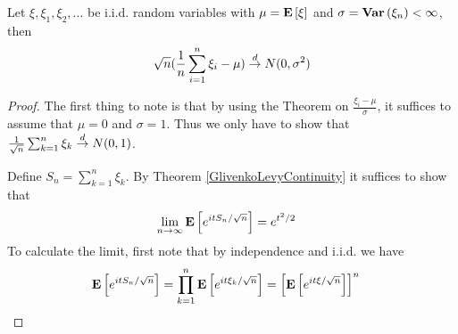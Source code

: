 \begin{thm}\label{CentralLimitTheorem}Let
  $\xi, \xi_1, \xi_2, \dots$ be i.i.d. random variables with $\mu =
  \textbf{E}\left[\xi\right]$ and 
  $\sigma = \textbf{Var} \left (\xi_n \right ) < \infty$, then 
\begin{align*}
\sqrt{n} (\frac{1}{n}\sum_{i=1}^n \xi_i -  \mu) \overset{d}\to N(0,\sigma^2)
\end{align*}
\end{thm}
\begin{proof}
The first thing to note is that by using the Theorem on $\frac{\xi_i -
  \mu}{\sigma}$, it suffices to assume that $\mu = 0$
and $\sigma = 1$.  Thus we only have to show that $\frac{1}{\sqrt{n}}
\sum_{k=1}^n \xi_k \overset{d}\to N(0,1)$.  

Define $S_n = \sum_{k=1}^n \xi_k$.  By Theorem
\ref{GlivenkoLevyContinuity} it suffices to show that 
\begin{align*}
\lim_{n \to \infty} \textbf{E}\left[e^{itS_n/\sqrt{n}}\right] &= e^{t^2/2}
\end{align*}
To calculate the limit, first note that by independence and i.i.d. we
have 
\begin{align*}
\textbf{E}\left[e^{itS_n/\sqrt{n}}\right] &= \prod_{k=1}^n
\textbf{E}\left[e^{it\xi_k/\sqrt{n}}\right]  = \left[\textbf{E}\left[e^{it\xi/\sqrt{n}}\right]\right]^n
\end{align*}


\end{proof}

